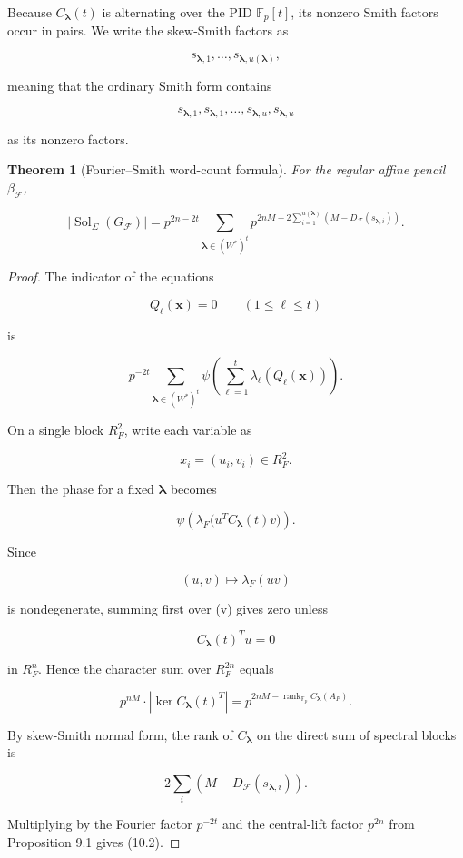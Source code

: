 \documentclass[11pt]{article}
\newtheorem{theorem}{Theorem}[section]
\begin{document}
Because $C_{\boldsymbol\lambda}(t)$ is alternating over the PID $\mathbb F_p[t]$, its nonzero Smith factors occur in pairs. We write the skew-Smith factors as

\[
s_{\boldsymbol\lambda,1},\ldots,
s_{\boldsymbol\lambda,u(\boldsymbol\lambda)},
\]

meaning that the ordinary Smith form contains

\[
s_{\boldsymbol\lambda,1},s_{\boldsymbol\lambda,1},
\ldots,
s_{\boldsymbol\lambda,u},s_{\boldsymbol\lambda,u}
\]

as its nonzero factors.

\begin{theorem}[Fourier--Smith word-count formula]
For the regular affine pencil $\beta_{\mathcal F}$,

\[
\boxed{
|\operatorname{Sol}_{\Sigma}(G_{\mathcal F})|
=p^{2n-2t}
\sum_{\boldsymbol\lambda\in(W^*)^t}
p^{
2nM
-2\displaystyle\sum_{i=1}^{u(\boldsymbol\lambda)}
\left(
M-D_{\mathcal F}
(s_{\boldsymbol\lambda,i})
\right)
}.
}
\tag{10.2}
\]

\end{theorem}

\begin{proof}
The indicator of the equations

\[
Q_\ell(\mathbf x)=0
\qquad
(1\le\ell\le t)
\]

is

\[
p^{-2t}
\sum_{\boldsymbol\lambda\in(W^*)^t}
\psi\left(
\sum_{\ell=1}^t
\lambda_\ell(Q_\ell(\mathbf x))
\right).
\]

On a single block $R_F^2$, write each variable as

\[
x_i=(u_i,v_i)\in R_F^2.
\]

Then the phase for a fixed $\boldsymbol\lambda$ becomes

\[
\psi\left(
\lambda_F
\bigl(
u^T C_{\boldsymbol\lambda}(t)v
\bigr)
\right).
\]

Since

\[
(u,v)\mapsto \lambda_F(uv)
\]

is nondegenerate, summing first over (v) gives zero unless

\[
C_{\boldsymbol\lambda}(t)^T u=0
\]

in $R_F^n$. Hence the character sum over $R_F^{2n}$ equals

\[
p^{nM}
\cdot
|\ker C_{\boldsymbol\lambda}(t)^T|
=p^{2nM-\operatorname{rank}_{\mathbb F_p}C_{\boldsymbol\lambda}(A_F)}.
\]

By skew-Smith normal form, the rank of $C_{\boldsymbol\lambda}$ on the direct sum of spectral blocks is

\[
2\sum_i
\left(
M-D_{\mathcal F}(s_{\boldsymbol\lambda,i})
\right).
\]

Multiplying by the Fourier factor $p^{-2t}$ and the central-lift factor $p^{2n}$ from Proposition 9.1 gives (10.2).

\end{proof}
\end{document}
